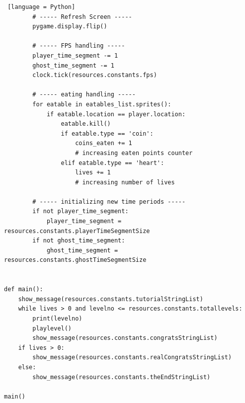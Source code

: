 \documentclass[11pt,a4paper,notitlepage]{report}
\begin{document}
\begin{lstlisting} [language = Python]
        # ----- Refresh Screen -----
        pygame.display.flip()

        # ----- FPS handling -----
        player_time_segment -= 1
        ghost_time_segment -= 1
        clock.tick(resources.constants.fps)

        # ----- eating handling -----
        for eatable in eatables_list.sprites():
            if eatable.location == player.location:
                eatable.kill()
                if eatable.type == 'coin':
                    coins_eaten += 1
                    # increasing eaten points counter
                elif eatable.type == 'heart':
                    lives += 1
                    # increasing number of lives

        # ----- initializing new time periods -----
        if not player_time_segment:
            player_time_segment = resources.constants.playerTimeSegmentSize
        if not ghost_time_segment:
            ghost_time_segment = resources.constants.ghostTimeSegmentSize


def main():
    show_message(resources.constants.tutorialStringList)
    while lives > 0 and levelno <= resources.constants.totallevels:
        print(levelno)
        playlevel()
        show_message(resources.constants.congratsStringList)
    if lives > 0:
        show_message(resources.constants.realCongratsStringList)
    else:
        show_message(resources.constants.theEndStringList)

main()
			\end{lstlisting}
\end{document}
